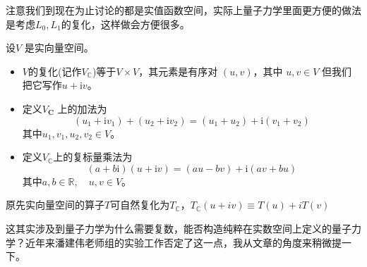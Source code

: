 注意我们到现在为止讨论的都是实值函数空间，实际上量子力学里面更方便的做法是考虑$L_0,L_1$的复化，这样做会方便很多。
\begin{definition}[复化]
	设$V$ 是实向量空间。
	\begin{itemize}
		\item 	$ V$的复化(记作$V_\mathbb{C}$)等于$V\times V$，其元素是有序对 $(u,v)$，其中 $u,v\in V$
		但我们把它写作$u+\mathrm{i}v$。\\
		\item
		定义$V_{\mathbf{C}}$ 上的加法为
		$$(u_1+\mathrm{i}v_1)+(u_2+\mathrm{i}v_2)=(u_1+u_2)+\mathrm{i}(v_1+v_2)$$
		其中$u_1,v_1,u_2,v_2\in V$。\\
		\item
		定义$V_{\mathbb{C}}$上的复标量乘法为
		$$(a+b\text{i})(u+\text{i}v)=(au-bv)+\text{i}(av+bu)$$
		其中$a, b\in \mathbb{R} , \quad u, v \in V$。
	\end{itemize}
	原先实向量空间的算子$T$可自然复化为$T_{\mathbb{C}}$，$T_\mathbb{C}(u+iv)\equiv T(u)+iT(v) $
\end{definition}
\begin{remark}
	这其实涉及到量子力学为什么需要复数，能否构造纯粹在实数空间上定义的量子力学？近年来潘建伟老师组的实验工作否定了这一点\cite{Renou:2021dvp,Chen:2021ril}，我从文章\cite{karam_why_2020}的角度来稍微提一下。
\end{remark}

